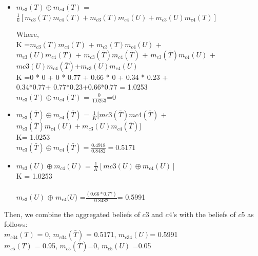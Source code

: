 \documentclass[preprint]{elsarticle}
\theoremstyle{definition}
\theoremstyle{remark}
\theoremstyle{property}
\begin{document}
\begin{itemize}

\item $m_{c3}(T) \oplus m_{c4}(T)$ = $\frac{1}{k}[m_{c3}(T)m_{c4}(T) +
m_{c3}(T)m_{c4}(U)+m_{c3}(U)m_{c4}(T)]$

Where, \\
K =$m_{c3}(T)m_{c4}(T)$ + $m_{c3}(T)m_{c4}(U)$ +\\
$m_{c3}(U)m_{c4}(T)$ + $m_{c3}(\bar{T} )m_{c4}(\bar{T})$ + $m_{c3}(\bar{T})m_{c4}(U)$ +\\
$mc3(U)m_{c4}(\bar{T})$+$m_{c3}(U)m_{c4}(U)$\\

K =0 * 0 + 0 * 0.77 + 0.66 * 0 + 0.34 * 0.23 + \\
0.34*0.77+ 0.77*0.23+0.66*0.77 = 1.0253\\
$m_{c3}(T) \oplus m_{c4}(T)$ = $\frac{0}{1.0253}$=0 \\

\item $m_{c3}(\bar{T}) \oplus m_{c4}(\bar{T})$ = $\frac{1}{K} [mc3(\bar{T})mc4(\bar{T})$ +\\
$m_{c3}(\bar{T})m_{c4}(U)+m_{c3}(U)m_{c4}(\bar{T})]$\\
K= 1.0253\\
$m_{c3}(\bar{T}) \oplus m_{c4}(\bar{T}) =\frac{0.4918}{0.8482} = 0.5171$ \\

\item $m_{c3}(U) \oplus m_{c4}(U)$ = $\frac{1}{K} [mc3(U)\oplus m_{c4}(U)]$\\
K = 1.0253\\ \\
$m_{c3}(U)$ $\oplus$ $m_{c4}(U$) =$\frac{(0.66 \ast 0.77)}{0.8482}$= 0.5991 \\

\end{itemize}

Then, we combine the aggregated beliefs of $c3$ and
$c4$'s with the beliefs of $c5$ as follows: \\

$m_{c34}(T)$ = 0, $m_{c34}(\bar{T})$ = 0.5171, $m_{c34}(U)$= 0.5991 \\


$m_{c5}(T)$ = 0.95, $m_{c5}(\bar{T})$=0, $m_{c5}(U)$ =0.05 \\
\end{document}
